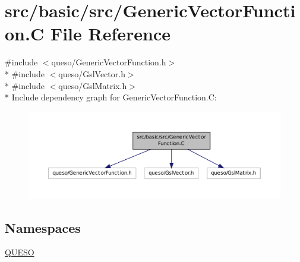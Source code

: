 \hypertarget{_generic_vector_function_8_c}{\section{src/basic/src/\-Generic\-Vector\-Function.C File Reference}
\label{_generic_vector_function_8_c}
}
{\ttfamily \#include $<$queso/\-Generic\-Vector\-Function.\-h$>$}\\*
{\ttfamily \#include $<$queso/\-Gsl\-Vector.\-h$>$}\\*
{\ttfamily \#include $<$queso/\-Gsl\-Matrix.\-h$>$}\\*
Include dependency graph for Generic\-Vector\-Function.\-C\-:
\nopagebreak
\begin{figure}[H]
\begin{center}
\leavevmode
\includegraphics[width=350pt]{_generic_vector_function_8_c__incl}
\end{center}
\end{figure}
\subsection*{Namespaces}
\begin{DoxyCompactItemize}
\item 
\hyperlink{namespace_q_u_e_s_o}{Q\-U\-E\-S\-O}
\end{DoxyCompactItemize}
